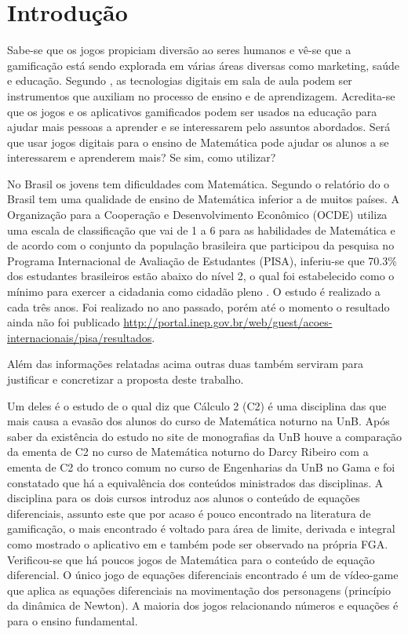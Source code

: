 \chapter[Introdução]{Introdução}


Sabe-se que os jogos propiciam diversão ao seres humanos e vê-se que a gamificação está sendo explorada em várias áreas diversas como marketing, saúde e educação. Segundo \cite{revbibmatgam}, as tecnologias digitais em sala de aula podem ser instrumentos que auxiliam no processo de ensino e de aprendizagem. Acredita-se que os jogos e os aplicativos gamificados podem ser usados na educação para ajudar mais pessoas a aprender e se interessarem pelo assuntos abordados. Será que usar jogos digitais para o ensino de Matemática pode ajudar os alunos a se interessarem e aprenderem mais? Se sim, como utilizar? 

No Brasil os jovens tem dificuldades com Matemática. Segundo o relatório do \cite{inep2015nivelcidadania} o Brasil tem uma qualidade de ensino de Matemática inferior a de muitos países. A Organização para a Cooperação e Desenvolvimento Econômico (OCDE) utiliza uma escala de classificação que vai de 1 a 6 para as habilidades de Matemática e de acordo com o conjunto da população brasileira que participou da pesquisa no Programa Internacional de Avaliação de Estudantes (PISA), inferiu-se que 70.3\% dos estudantes brasileiros estão abaixo do nível 2, o qual foi estabelecido como o mínimo para exercer a cidadania como cidadão pleno \cite{inep2015nivelcidadania}.
O estudo é realizado a cada três anos. Foi realizado no ano passado, porém até o momento o resultado ainda não foi publicado \url{http://portal.inep.gov.br/web/guest/acoes-internacionais/pisa/resultados}.

Além das informações relatadas acima outras duas também serviram para justificar e concretizar a proposta deste trabalho. 

Um deles é o estudo de \cite{evasaoC2} o qual diz que Cálculo 2 (C2) é uma disciplina das que mais causa a evasão dos alunos do curso de Matemática noturno na UnB. Após saber da existência do estudo no site de monografias da UnB houve a comparação da ementa de C2 no curso de Matemática noturno do Darcy Ribeiro com a ementa de C2 do tronco comum no curso de Engenharias da UnB no Gama e foi constatado que há a equivalência dos conteúdos ministrados das disciplinas. A disciplina para os dois cursos introduz aos alunos o conteúdo de equações diferenciais, assunto este que por acaso é pouco encontrado na literatura de gamificação, o mais encontrado é voltado para área de limite, derivada e integral como mostrado o aplicativo em \cite{appcalculo} e também pode ser observado na própria FGA. Verificou-se que há poucos jogos de Matemática para o conteúdo de equação diferencial. O único jogo de equações diferenciais encontrado é um de vídeo-game que aplica as equações diferenciais na movimentação dos personagens (princípio da dinâmica de Newton)\cite{videoGameED}. A maioria dos jogos relacionando números e equações é para o ensino fundamental.

